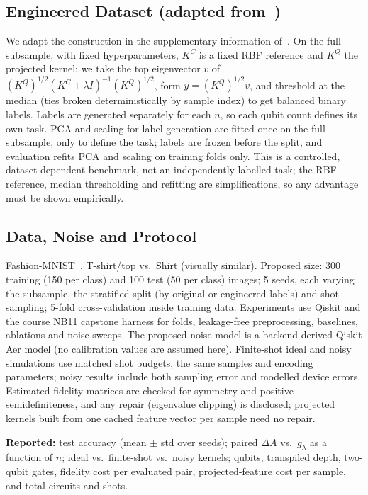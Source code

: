 \documentclass[conference]{IEEEtran}
\begin{document}
\subsection{Engineered Dataset (adapted from~\cite{huang2021})}
We adapt the construction in the supplementary information of~\cite{huang2021}. On the full subsample, with fixed hyperparameters, $K^{C}$ is a fixed RBF reference and $K^{Q}$ the projected kernel; we take the top eigenvector $v$ of $(K^{Q})^{1/2}(K^{C}+\lambda I)^{-1}(K^{Q})^{1/2}$, form $y=(K^{Q})^{1/2}v$, and threshold at the median (ties broken deterministically by sample index) to get balanced binary labels. Labels are generated separately for each $n$, so each qubit count defines its own task. PCA and scaling for label generation are fitted once on the full subsample, only to define the task; labels are frozen before the split, and evaluation refits PCA and scaling on training folds only. This is a controlled, dataset-dependent benchmark, not an independently labelled task; the RBF reference, median thresholding and refitting are simplifications, so any advantage must be shown empirically.

\subsection{Data, Noise and Protocol}
Fashion-MNIST~\cite{xiao2017}, T-shirt/top vs.\ Shirt (visually similar). Proposed size: 300 training (150 per class) and 100 test (50 per class) images; 5 seeds, each varying the subsample, the stratified split (by original or engineered labels) and shot sampling; 5-fold cross-validation inside training data. Experiments use Qiskit and the course NB11 capstone harness for folds, leakage-free preprocessing, baselines, ablations and noise sweeps. The proposed noise model is a backend-derived Qiskit Aer model (no calibration values are assumed here). Finite-shot ideal and noisy simulations use matched shot budgets, the same samples and encoding parameters; noisy results include both sampling error and modelled device errors. Estimated fidelity matrices are checked for symmetry and positive semidefiniteness, and any repair (eigenvalue clipping) is disclosed; projected kernels built from one cached feature vector per sample need no repair.

\textbf{Reported:} test accuracy (mean $\pm$ std over seeds); paired $\Delta A$ vs.\ $g_\lambda$ as a function of $n$; ideal vs.\ finite-shot vs.\ noisy kernels; qubits, transpiled depth, two-qubit gates, fidelity cost per evaluated pair, projected-feature cost per sample, and total circuits and shots.
\end{document}
